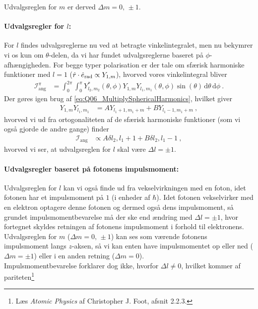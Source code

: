 Udvalgsreglen for $m$ er derved $\Delta m = 0,\, \pm 1$.


\paragraph{Udvalgsregler for $l$:} For $l$ findes udvalgsreglerne nu ved at betragte vinkelintegralet, men nu bekymrer vi os kun om $\theta$-delen, da vi har fundet udvalgsreglerne baseret på $\phi$-afhængigheden. For begge typer polarisation er der tale om sfærisk harmoniske funktioner med $l = 1$ ($\Hat{r}\cdot\Hat{e}_\text{rad} \propto Y_{1,m}$), hvorved vores vinkelintegral bliver
\begin{align}
    \mathcal{I}_\text{ang}^\pi &= \int_0^{2\pi}\int_0^\pi Y_{l_2,m_2}^*(\theta,\phi) Y_{1,m} Y_{l_1,m_1}(\theta,\phi) \sin(\theta) \, \text{d}\theta \, \text{d}\phi \: .
\end{align}
Der gøres igen brug af \cref{eq:Q06_MultiplySphericalHarmonics}, hvilket giver
\begin{align}
    Y_{1,m}Y_{l_1,m_1} &= A Y_{l_1 + 1,m_1+m} + B Y_{l_1-1,m_1+m} \: ,
\end{align}
hvorved vi ud fra ortogonaliteten af de sfærisk harmoniske funktioner (som vi også gjorde de andre gange) finder
\begin{align}
    \mathcal{I}_\text{ang} &\propto A \delta{l_2,l_1+1} + B \delta{l_2,l_1-1} \: ,
\end{align}
hvorved vi ser, at udvalgsreglen for $l$ skal være $\Delta l = \pm 1$.


\paragraph{Udvalgsregler baseret på fotonens impulsmoment:} Udvalgsreglen for $l$ kan vi også finde ud fra vekselvirkningen med en foton, idet fotonen har et impulsmoment på $1$ (i enheder af $\hbar$). Idet fotonen vekselvirker med en elektron optagere denne fotonen og dermed også dens impulsmoment, så grundet impulsmomentbevarelse må der ske end ændring med $\Delta l = \pm 1$, hvor fortegnet skyldes retningen af fotonens impulsmoment i forhold til elektronens.\\
Udvalgsreglen for $m$ ($\Delta m = 0,\, \pm 1$) kan ses som værende fotonens impulsmoment langs $z$-aksen, så vi kan enten have impulsmomentet op eller ned ($\Delta m = \pm 1$) eller i en anden retning ($\Delta m = 0$).\\
Impulsmomentbevarelse forklarer dog ikke, hvorfor $\Delta l \ne 0$, hvilket kommer af pariteten\footnote{Læs \textit{Atomic Physics} af Christopher J. Foot, afsnit 2.2.3.}


